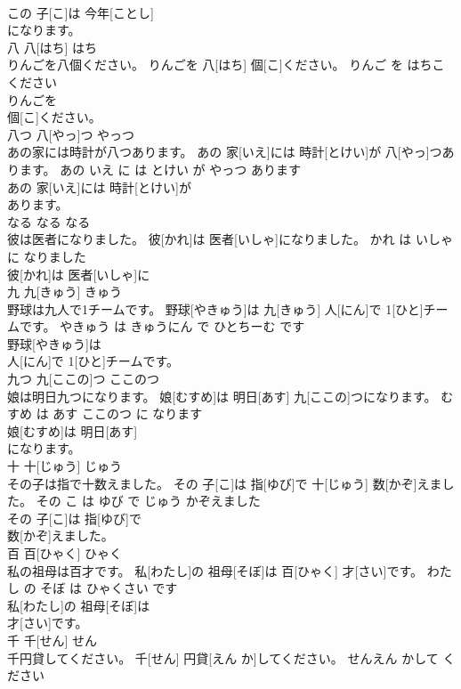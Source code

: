 \documentclass[8pt]{extreport}
\begin{document}
\begin{CJK}{UTF8}{min}
\\	この 子[こ]は 今年[ことし]
\\	になります。			
\\	八	八[はち]	はち	
\\	りんごを八個ください。	りんごを 八[はち] 個[こ]ください。	りんご を はちこ ください	
\\	りんごを
\\	個[こ]ください。			
\\	八つ	八[やっ]つ	やっつ	
\\	あの家には時計が八つあります。	あの 家[いえ]には 時計[とけい]が 八[やっ]つあります。	あの いえ に は とけい が やっつ あります	
\\	あの 家[いえ]には 時計[とけい]が
\\	あります。			
\\	なる	なる	なる	
\\	彼は医者になりました。	彼[かれ]は 医者[いしゃ]になりました。	かれ は いしゃ に なりました	
\\	彼[かれ]は 医者[いしゃ]に
\\	九	九[きゅう]	きゅう	
\\	野球は九人で1チームです。	野球[やきゅう]は 九[きゅう] 人[にん]で 1[ひと]チームです。	やきゅう は きゅうにん で ひとちーむ です	
\\	野球[やきゅう]は
\\	人[にん]で 1[ひと]チームです。			
\\	九つ	九[ここの]つ	ここのつ	
\\	娘は明日九つになります。	娘[むすめ]は 明日[あす] 九[ここの]つになります。	むすめ は あす ここのつ に なります	
\\	娘[むすめ]は 明日[あす]
\\	になります。			
\\	十	十[じゅう]	じゅう	
\\	その子は指で十数えました。	その 子[こ]は 指[ゆび]で 十[じゅう] 数[かぞ]えました。	その こ は ゆび で じゅう かぞえました	
\\	その 子[こ]は 指[ゆび]で
\\	数[かぞ]えました。			
\\	百	百[ひゃく]	ひゃく	
\\	私の祖母は百才です。	私[わたし]の 祖母[そぼ]は 百[ひゃく] 才[さい]です。	わたし の そぼ は ひゃくさい です	
\\	私[わたし]の 祖母[そぼ]は
\\	才[さい]です。			
\\	千	千[せん]	せん	
\\	千円貸してください。	千[せん] 円貸[えん か]してください。	せんえん かして ください	

\end{CJK}
\end{document}
